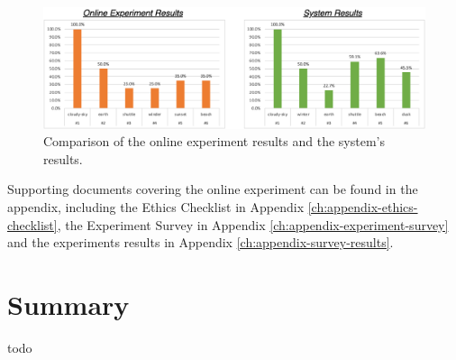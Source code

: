 \begin{figure}[h] 
\centerline{\includegraphics[width=\textwidth]{figures/evaluation/ground_truth_vs_system_results.png}}
\caption{\label{fig:evaluation-ground_truth_vs_system_results}Comparison of the online experiment results and the system's results.}
\end{figure}

Supporting documents covering the online experiment can be found in the appendix, including the Ethics Checklist in Appendix \ref{ch:appendix-ethics-checklist}, the Experiment Survey in Appendix \ref{ch:appendix-experiment-survey} and the experiments results in Appendix \ref{ch:appendix-survey-results}.


\section{Summary}

todo